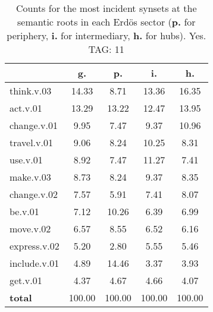 \begin{table}[h!]
\begin{center}
\begin{tabular}{| l || c | c | c | c |}\hline
 & {\bf g.} & {\bf p.} & {\bf i.} & {\bf h.} \\\hline\hline
think.v.03 & 14.33  & 8.71  & 13.36  & 16.35 \\\hline
act.v.01 & 13.29  & 13.22  & 12.47  & 13.95 \\\hline
change.v.01 & 9.95  & 7.47  & 9.37  & 10.96 \\\hline
travel.v.01 & 9.06  & 8.24  & 10.25  & 8.31 \\\hline
use.v.01 & 8.92  & 7.47  & 11.27  & 7.41 \\\hline
make.v.03 & 8.73  & 8.24  & 9.37  & 8.35 \\\hline
change.v.02 & 7.57  & 5.91  & 7.41  & 8.07 \\\hline
be.v.01 & 7.12  & 10.26  & 6.39  & 6.99 \\\hline
move.v.02 & 6.57  & 8.55  & 6.52  & 6.16 \\\hline
express.v.02 & 5.20  & 2.80  & 5.55  & 5.46 \\\hline
include.v.01 & 4.89  & 14.46  & 3.37  & 3.93 \\\hline
get.v.01 & 4.37  & 4.67  & 4.66  & 4.07 \\\hline\hline
{{\bf total}} & 100.00  & 100.00  & 100.00  & 100.00 \\\hline
\end{tabular}
\caption{Counts for the most incident synsets at the semantic roots in each Erd\"os sector ({\bf p.} for periphery, {\bf i.} for intermediary, {\bf h.} for hubs). Yes. TAG: 11}
\end{center}
\end{table}